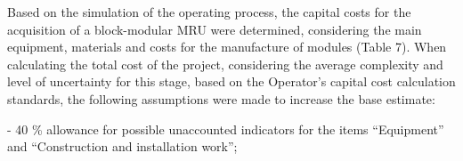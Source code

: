 
Based on the simulation of the operating process, the capital costs for
the acquisition of a block-modular MRU were determined, considering the
main equipment, materials and costs for the manufacture of modules
(Table 7). When calculating the total cost of the project, considering
the average complexity and level of uncertainty for this stage, based on
the Operator's capital cost calculation standards, the following
assumptions were made to increase the base estimate:

- 40 \% allowance for possible unaccounted indicators for the items
``Equipment'' and ``Construction and installation work'';

